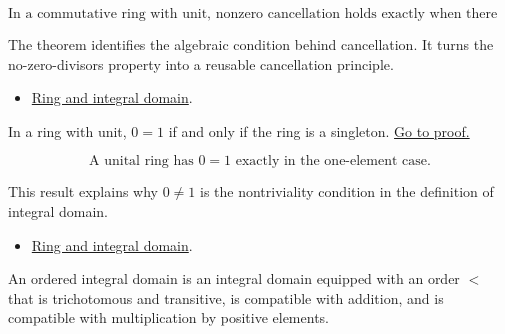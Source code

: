 \begin{remark*}
\[
  \text{In a commutative ring with unit, nonzero cancellation holds exactly
  when there are no zero divisors.}
\]
\end{remark*}

\begin{remark*}[Interpretation]
The theorem identifies the algebraic condition behind cancellation. It turns
the no-zero-divisors property into a reusable cancellation principle.
\end{remark*}

\begin{dependencies}
\begin{itemize}
  \item \hyperref[def:men-ring-integral-domain]{Ring and integral domain}.
\end{itemize}
\end{dependencies}

\begin{theorem}
\label{thm:men-trivial}
In a ring with unit, \(0=1\) if and only if the ring is a singleton.
\hyperref[prf:men-trivial]{Go to proof.}
\end{theorem}

\begin{remark*}
\[
  \text{A unital ring has }0=1\text{ exactly in the one-element case.}
\]
\end{remark*}

\begin{remark*}[Interpretation]
This result explains why \(0\neq 1\) is the nontriviality condition in the
definition of integral domain.
\end{remark*}

\begin{dependencies}
\begin{itemize}
  \item \hyperref[def:men-ring-integral-domain]{Ring and integral domain}.
\end{itemize}
\end{dependencies}

\begin{definition}
\label{def:men-ordered-integral-domain}
An ordered integral domain is an integral domain equipped with an order \(<\)
that is trichotomous and transitive, is compatible with addition, and is
compatible with multiplication by positive elements.
\end{definition}

